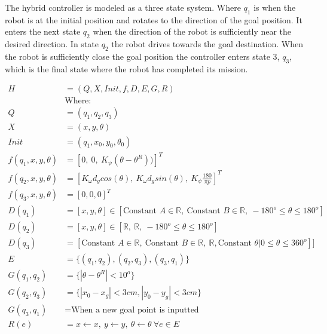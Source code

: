 The hybrid controller is modeled as a three state system. Where $q_1$ is when the robot is at the initial position and rotates to the direction of the goal position. It enters the next state $q_2$ when the direction of the robot is sufficiently near the desired direction. In state $q_2$ the robot drives towards the goal destination. When the robot is sufficiently close the goal position the controller enters state 3, $q_3$, which is the final state where the robot has completed its mission. 

\begin{align*}
H &= (Q,X,Init,f,D,E,G,R)\\
&\textrm{Where: }\\
Q &= (q_1,q_2,q_3)\\
X &= (x,y,\theta)\\
Init &= (q_1,x_0,y_0,\theta_0)\\
f(q_1, x, y, \theta) &= \left[0,\ 0,\ K_\psi(\theta-\theta^R))\right]^T \\
f(q_2, x, y, \theta) &= \left[  K_\omega d_g cos(\theta),\ K_\omega d_g sin(\theta),\ K_\psi \frac{180}{\pi p} \right]^T \\
f(q_3, x, y, \theta) &= \left[0, 0, 0\right]^T \\
D(q_1) &= [x,y,\theta]\in [\textrm{Constant } A \in \mathbb{R},\ \textrm{Constant } B \in \mathbb{R}, \ -180^o\leq\theta\leq 180^o    ]\\
D(q_2) &= [x,y,\theta]\in [\mathbb{R},\ \mathbb{R},\ -180^o\leq\theta\leq 180^o   ]\\
D(q_3) &= [\textrm{Constant } A \in \mathbb{R},\ \textrm{Constant } B \in \mathbb{R},\ \mathbb{R}, \textrm{Constant } \theta | 0\leq\theta\leq360^o   ]    ]\\
E&=\{(q_1, q_2), (q_2, q_3), (q_3, q_1) \}\\
G(q_1, q_2) &= \{|\theta-\theta^R|<10^o \}\\
G(q_2, q_3) &= \{|x_0-x_g|<3cm,|y_0-y_g|<3cm\}\\
G(q_3, q_1) &= \textrm{When a new goal point is inputted} \\
R(e)&= x \leftarrow x,\ y \leftarrow y,\ \theta \leftarrow \theta \ \forall e \in E
\end{align*}  
